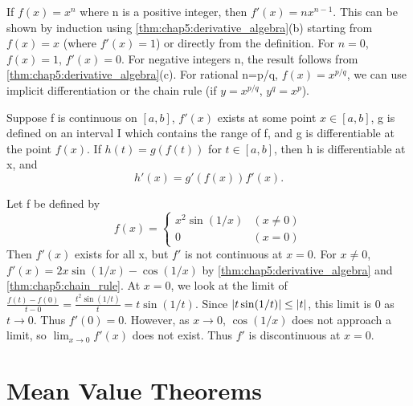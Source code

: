 \begin{example}[Derivative of $x^n$] %
  \label{ex:chap5:derivative_xn}
  If $f(x) = x^n$ where n is a positive integer, then $f'(x) =
  nx^{n-1}$. This can be shown by induction using
  \autoref{thm:chap5:derivative_algebra}(b) starting from $f(x)=x$
  (where $f'(x)=1$) or directly from the definition. For $n=0$,
  $f(x)=1$, $f'(x)=0$. For negative integers n, the result follows
  from \autoref{thm:chap5:derivative_algebra}(c). For rational n=p/q,
  $f(x)=x^{p/q}$, we can use implicit differentiation or the chain
  rule (if $y=x^{p/q}$, $y^q=x^p$).
\end{example}


\begin{theorem} %
  \label{thm:chap5:chain_rule}
  Suppose f is continuous on $[a, b]$, $f'(x)$ exists at some point
  $x \in [a, b]$, g is defined on an interval I which contains the
  range of f, and g is differentiable at the point $f(x)$. If $h(t) =
  g(f(t))$ for $t \in [a, b]$, then h is differentiable at x, and
  \[ h'(x) = g'(f(x)) f'(x). \]
\end{theorem}



\begin{example} %
  \label{ex:chap5:x2sin1x_example}
  Let f be defined by
  \[ f(x) =
    \begin{cases} x^2 \sin(1/x) & (x \ne 0) \\ 0 & (x=0)
  \end{cases} \]
  Then $f'(x)$ exists for all x, but $f'$ is not continuous at $x=0$.
  For $x \ne 0$, $f'(x) = 2x \sin(1/x) - \cos(1/x)$ by
  \autoref{thm:chap5:derivative_algebra} and \autoref{thm:chap5:chain_rule}.
  At $x=0$, we look at the limit of $\frac{f(t)-f(0)}{t-0} =
  \frac{t^2 \sin(1/t)}{t} = t \sin(1/t)$. Since $\left\lvert t \sin(1/t) \right\rvert
  \le \left\lvert t \right\rvert$, this limit is 0 as $t \to 0$. Thus $f'(0)=0$.
  However, as $x \to 0$, $\cos(1/x)$ does not approach a limit, so
  $\lim_{x \to 0} f'(x)$ does not exist. Thus $f'$ is discontinuous at $x=0$.
\end{example}

\section{Mean Value Theorems}
\label{sec:chap5:mvt}


